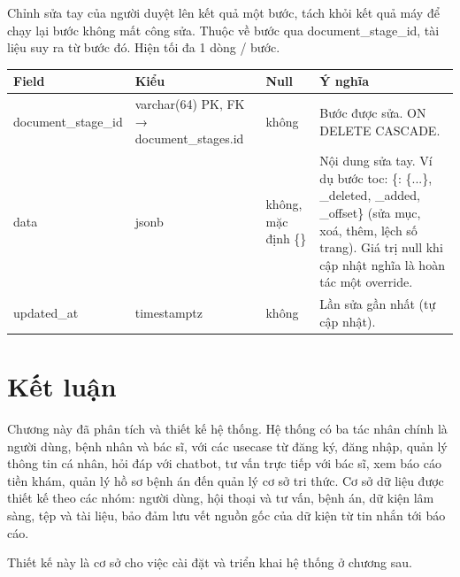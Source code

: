 Chỉnh sửa tay của người duyệt lên kết quả một bước, tách khỏi kết quả máy để chạy lại bước không mất công sửa. Thuộc về bước qua document\_stage\_id, tài liệu suy ra từ bước đó. Hiện tối đa 1 dòng / bước.
\begin{longtable}{|>{\raggedright\arraybackslash}p{0.250\dimexpr\linewidth-8\tabcolsep\relax}|>{\raggedright\arraybackslash}p{0.250\dimexpr\linewidth-8\tabcolsep\relax}|>{\raggedright\arraybackslash}p{0.250\dimexpr\linewidth-8\tabcolsep\relax}|>{\raggedright\arraybackslash}p{0.250\dimexpr\linewidth-8\tabcolsep\relax}|}
\hline
\textbf{Field} & \textbf{Kiểu} & \textbf{Null} & \textbf{Ý nghĩa} \\ \hline
\endhead
document\_stage\_id & varchar(64) PK, FK → document\_stages.id & không & Bước được sửa. ON DELETE CASCADE. \\ \hline
data & jsonb & không, mặc định \{\} & Nội dung sửa tay. Ví dụ bước toc: \{<id mục>: \{...\}, \_deleted, \_added, \_offset\} (sửa mục, xoá, thêm, lệch số trang). Giá trị null khi cập nhật nghĩa là hoàn tác một override. \\ \hline
updated\_at & timestamptz & không & Lần sửa gần nhất (tự cập nhật). \\ \hline
\end{longtable}

\section{Kết luận}

Chương này đã phân tích và thiết kế hệ thống. Hệ thống có ba tác nhân chính là người dùng, bệnh nhân và bác sĩ, với các usecase từ đăng ký, đăng nhập, quản lý thông tin cá nhân, hỏi đáp với chatbot, tư vấn trực tiếp với bác sĩ, xem báo cáo tiền khám, quản lý hồ sơ bệnh án đến quản lý cơ sở tri thức. Cơ sở dữ liệu được thiết kế theo các nhóm: người dùng, hội thoại và tư vấn, bệnh án, dữ kiện lâm sàng, tệp và tài liệu, bảo đảm lưu vết nguồn gốc của dữ kiện từ tin nhắn tới báo cáo.

Thiết kế này là cơ sở cho việc cài đặt và triển khai hệ thống ở chương sau.
